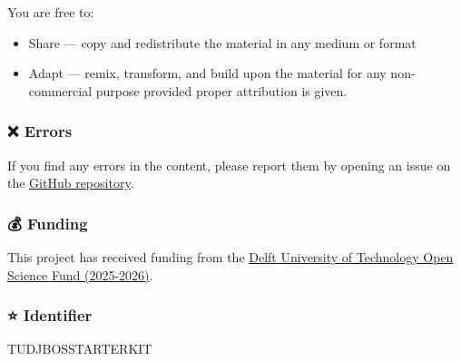 You are free to:

\begin{itemize}
\item Share --- copy and redistribute the material in any medium or format
\item Adapt --- remix, transform, and build upon the material for any non-commercial purpose provided proper attribution is given.
\end{itemize}

\subsubsection{❌ Errors}

If you find any errors in the content, please report them by opening an issue on the \href{https://github.com/TUD-JB-OS/book/issues}{GitHub repository}.

\subsubsection{💰 Funding}

This project has received funding from the \href{https://www.tudelft.nl/en/open-science/articles-tu-delft/mainstreaming-open-science-fund-2025-2026}{Delft University of Technology Open Science Fund (2025-2026)}.

\subsubsection{⭐ Identifier}

TUDJBOSSTARTERKIT
